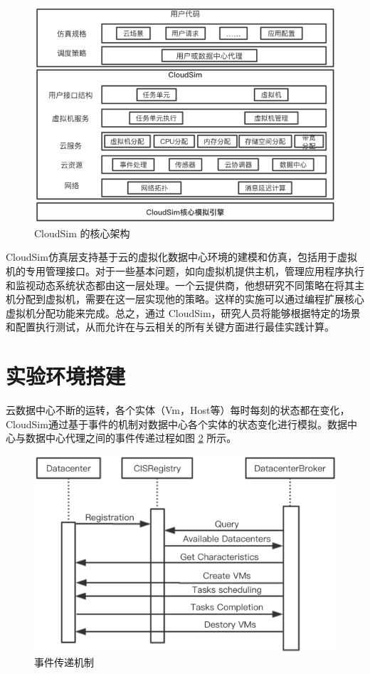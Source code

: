 \begin{figure}[htb]
  \centering
  \includegraphics{./Figure/IMG_Chap4_1.png}
  \caption{CloudSim 的核心架构}\label{Fig:chap4_1}
\end{figure}

 CloudSim仿真层支持基于云的虚拟化数据中心环境的建模和仿真，包括用于虚拟机的专用管理接口。对于一些基本问题，如向虚拟机提供主机，管理应用程序执行和监视动态系统状态都由这一层处理。一个云提供商，他想研究不同策略在将其主机分配到虚拟机，需要在这一层实现他的策略。这样的实施可以通过编程扩展核心虚拟机分配功能来完成。总之，通过 CloudSim，研究人员将能够根据特定的场景和配置执行测试，从而允许在与云相关的所有关键方面进行最佳实践计算。

 \section{实验环境搭建}
云数据中心不断的运转，各个实体（Vm，Host等）每时每刻的状态都在变化，CloudSim通过基于事件的机制对数据中心各个实体的状态变化进行模拟。数据中心与数据中心代理之间的事件传递过程如图 \ref{Fig:chap4_2} 所示。

\begin{figure}[htb]
  \centering
  \includegraphics{./Figure/IMG_Chap4_2.png}
  \caption{事件传递机制}\label{Fig:chap4_2}
\end{figure}

